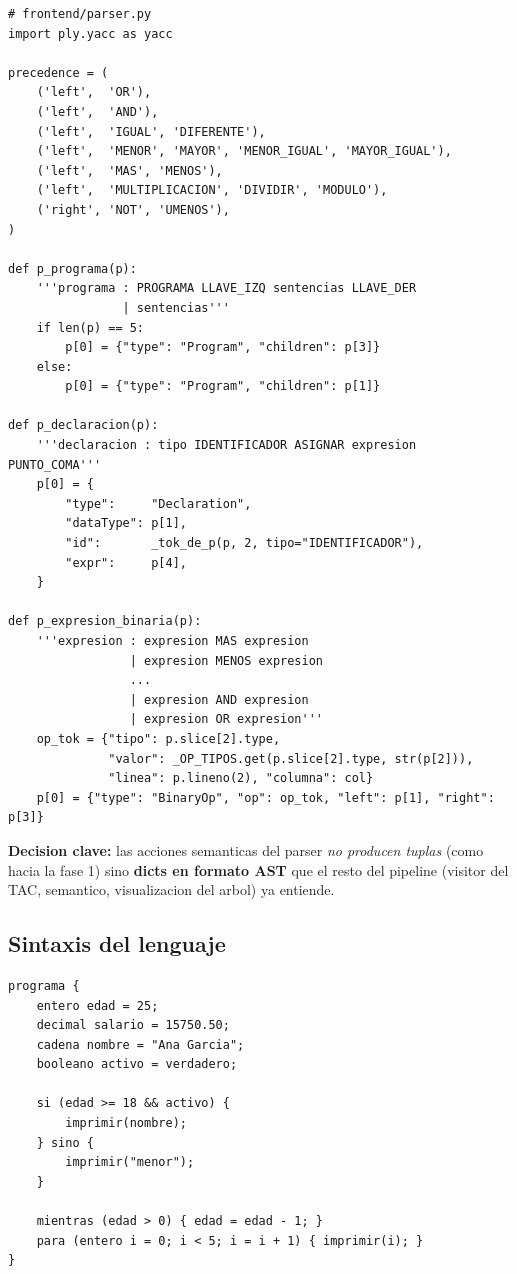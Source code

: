 \documentclass[11pt,a4paper]{article}
\begin{document}
\begin{lstlisting}[style=py]
# frontend/parser.py
import ply.yacc as yacc

precedence = (
    ('left',  'OR'),
    ('left',  'AND'),
    ('left',  'IGUAL', 'DIFERENTE'),
    ('left',  'MENOR', 'MAYOR', 'MENOR_IGUAL', 'MAYOR_IGUAL'),
    ('left',  'MAS', 'MENOS'),
    ('left',  'MULTIPLICACION', 'DIVIDIR', 'MODULO'),
    ('right', 'NOT', 'UMENOS'),
)

def p_programa(p):
    '''programa : PROGRAMA LLAVE_IZQ sentencias LLAVE_DER
                | sentencias'''
    if len(p) == 5:
        p[0] = {"type": "Program", "children": p[3]}
    else:
        p[0] = {"type": "Program", "children": p[1]}

def p_declaracion(p):
    '''declaracion : tipo IDENTIFICADOR ASIGNAR expresion PUNTO_COMA'''
    p[0] = {
        "type":     "Declaration",
        "dataType": p[1],
        "id":       _tok_de_p(p, 2, tipo="IDENTIFICADOR"),
        "expr":     p[4],
    }

def p_expresion_binaria(p):
    '''expresion : expresion MAS expresion
                 | expresion MENOS expresion
                 ...
                 | expresion AND expresion
                 | expresion OR expresion'''
    op_tok = {"tipo": p.slice[2].type,
              "valor": _OP_TIPOS.get(p.slice[2].type, str(p[2])),
              "linea": p.lineno(2), "columna": col}
    p[0] = {"type": "BinaryOp", "op": op_tok, "left": p[1], "right": p[3]}
\end{lstlisting}

\textbf{Decision clave:} las acciones semanticas del parser \emph{no
producen tuplas} (como hacia la fase 1) sino \textbf{dicts en formato AST}
que el resto del pipeline (visitor del TAC, semantico, visualizacion del
arbol) ya entiende.

\subsection{Sintaxis del lenguaje}

\begin{lstlisting}[style=ml]
programa {
    entero edad = 25;
    decimal salario = 15750.50;
    cadena nombre = "Ana Garcia";
    booleano activo = verdadero;

    si (edad >= 18 && activo) {
        imprimir(nombre);
    } sino {
        imprimir("menor");
    }

    mientras (edad > 0) { edad = edad - 1; }
    para (entero i = 0; i < 5; i = i + 1) { imprimir(i); }
}
\end{lstlisting}
\end{document}
